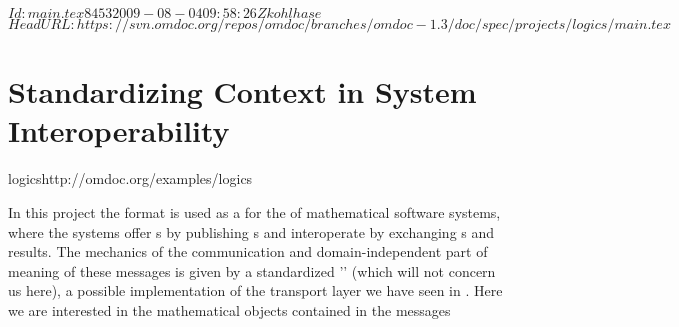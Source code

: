 \svnInfo $Id: main.tex 8453 2009-08-04 09:58:26Z kohlhase $
\svnKeyword $HeadURL: https://svn.omdoc.org/repos/omdoc/branches/omdoc-1.3/doc/spec/projects/logics/main.tex $

\section{Standardizing Context in System Interoperability}
\begin{project}{logics}{http://omdoc.org/examples/logics}
\end{project}

In this project the {\omdoc} format is used as a {} for the
{} of mathematical software systems, where the
systems offer {s} by publishing
{s} and interoperate by exchanging
{s} and results. The mechanics of the communication and
domain-independent part of meaning of these messages is given by a standardized
'{}' (which will not concern us here), a possible implementation of
the transport layer we have seen in {}. Here we are interested in the
mathematical objects contained in the messages

